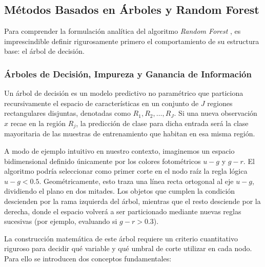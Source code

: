 \documentclass[12pt, a4paper]{report}
\begin{document}
\subsection{Métodos Basados en Árboles y Random Forest}

Para comprender la formulación analítica del algoritmo \textit{Random Forest} \citep{breiman2001}, es imprescindible definir rigurosamente primero el comportamiento de su estructura base: el árbol de decisión.

\subsubsection{Árboles de Decisión, Impureza y Ganancia de Información}

Un árbol de decisión es un modelo predictivo no paramétrico que particiona recursivamente el espacio de características en un conjunto de $J$ regiones rectangulares disjuntas, denotadas como $R_1, R_2, \dots, R_J$. Si una nueva observación $x$ recae en la región $R_j$, la predicción de clase para dicha entrada será la clase mayoritaria de las muestras de entrenamiento que habitan en esa misma región.

A modo de ejemplo intuitivo en nuestro contexto, imaginemos un espacio bidimensional definido únicamente por los colores fotométricos $u-g$ y $g-r$. El algoritmo podría seleccionar como primer corte en el nodo raíz la regla lógica $u-g < 0.5$. Geométricamente, esto traza una línea recta ortogonal al eje $u-g$, dividiendo el plano en dos mitades. Los objetos que cumplen la condición descienden por la rama izquierda del árbol, mientras que el resto desciende por la derecha, donde el espacio volverá a ser particionado mediante nuevas reglas sucesivas (por ejemplo, evaluando si $g-r > 0.3$).

La construcción matemática de este árbol requiere un criterio cuantitativo riguroso para decidir qué variable y qué umbral de corte utilizar en cada nodo. Para ello se introducen dos conceptos fundamentales:
\end{document}
